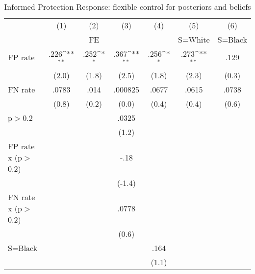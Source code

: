 \begin{table}[htbp]\centering
\def\sym#1{\ifmmode^{#1}\else\(^{#1}\)\fi}
\caption{Informed Protection Response: flexible control for posteriors and beliefs}
\begin{tabular}{l*{6}{c}}
\hline\hline
                &\multicolumn{1}{c}{(1)}&\multicolumn{1}{c}{(2)}&\multicolumn{1}{c}{(3)}&\multicolumn{1}{c}{(4)}&\multicolumn{1}{c}{(5)}&\multicolumn{1}{c}{(6)}\\
                &\multicolumn{1}{c}{}&\multicolumn{1}{c}{FE}&\multicolumn{1}{c}{}&\multicolumn{1}{c}{}&\multicolumn{1}{c}{S=White}&\multicolumn{1}{c}{S=Black}\\
\hline
FP rate         &     .226\sym{**} &     .252\sym{*}  &     .367\sym{**} &     .256\sym{*}  &     .273\sym{**} &     .129         \\
                &    (2.0)         &    (1.8)         &    (2.5)         &    (1.8)         &    (2.3)         &    (0.3)         \\
FN rate         &    .0783         &     .014         &  .000825         &    .0677         &    .0615         &    .0738         \\
                &    (0.8)         &    (0.2)         &    (0.0)         &    (0.4)         &    (0.4)         &    (0.6)         \\
p$>$0.2         &                  &                  &    .0325         &                  &                  &                  \\
                &                  &                  &    (1.2)         &                  &                  &                  \\
FP rate x (p$>$0.2)&                  &                  &     -.18         &                  &                  &                  \\
                &                  &                  &   (-1.4)         &                  &                  &                  \\
FN rate x (p$>$0.2)&                  &                  &    .0778         &                  &                  &                  \\
                &                  &                  &    (0.6)         &                  &                  &                  \\
S=Black         &                  &                  &                  &     .164         &                  &                  \\
                &                  &                  &                  &    (1.1)         &                  &                  \\

\end{tabular}
\end{table}
